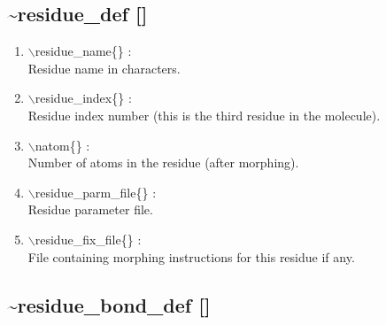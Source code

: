 \documentclass[12pt]{article}
\begin{document}
\newpage
\subsection*{\bf \~{ }residue\_def []}

\begin{enumerate}

 \vspace{0.15in} 
 \item  $\backslash$residue\_name\{\} : \\ 
    Residue name in characters.

 \vspace{0.15in} 
 \item  $\backslash$residue\_index\{\} : \\ 
    Residue index number (this is the third residue in the molecule).

 \vspace{0.15in} 
 \item  $\backslash$natom\{\} : \\ 
    Number of atoms in the residue (after morphing).

 \vspace{0.15in} 
 \item  $\backslash$residue\_parm\_file\{\} : \\ 
    Residue parameter file.

 \vspace{0.15in} 
 \item  $\backslash$residue\_fix\_file\{\} : \\ 
    File containing morphing instructions for this residue if any.

\end{enumerate}

\newpage
\subsection*{\bf \~{ }residue\_bond\_def []}
\end{document}
